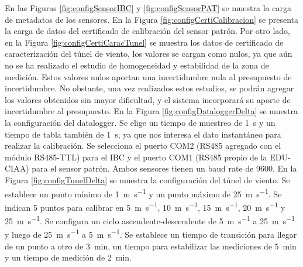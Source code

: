En las Figuras \ref{fig:configSensorIBC} y \ref{fig:configSensorPAT} se muestra la carga de metadatos de los sensores. En la Figura \ref{fig:configCertiCalibracion} se presenta la carga de datos del certificado de calibración del sensor patrón. Por otro lado, en la Figura \ref{fig:configCertiCaracTunel} se muestra los datos de certificado de caracterización del túnel de viento, los valores se cargan como nulos, ya que aún no se ha realizado el estudio de homogeneidad y estabilidad de la zona de medición. Estos valores nulos aportan una incertidumbre nula al presupuesto de incertidumbre. No obstante, una vez realizados estos estudios, se podrán agregar los valores obtenidos sin mayor dificultad, y el sistema incorporará su aporte de incertidumbre al presupuesto. En la Figura \ref{fig:configDataloggerDelta} se muestra la configuración del datalogger. Se elige un tiempo de muestreo de \SI{1}{\second} y un tiempo de tabla también de \SI{1}{\second}, ya que nos interesa el dato instantáneo para realizar la calibración. Se selecciona el puerto COM2 (RS485 agregado con el módulo RS485-TTL) para el IBC y el puerto COM1 (RS485 propio de la EDU-CIAA) para el sensor patrón. Ambos sensores tienen un baud rate de \SI{9600}{}. En la Figura \ref{fig:configTunelDelta} se muestra la configuración del túnel de viento. Se establece un punto mínimo de \SI{1}{\meter\per\second} y un punto máximo de \SI{25}{\meter\per\second}. Se indican 5 puntos para calibrar en \SI{5}{\meter\per\second}, \SI{10}{\meter\per\second}, \SI{15}{\meter\per\second}, \SI{20}{\meter\per\second} y \SI{25}{\meter\per\second}. Se configura un ciclo ascendente-descendente de \SI{5}{\meter\per\second} a \SI{25}{\meter\per\second} y luego de \SI{25}{\meter\per\second} a \SI{5}{\meter\per\second}. Se establece un tiempo de transición para llegar de un punto a otro de \SI{3}{\minute}, un tiempo para estabilizar las mediciones de \SI{5}{\minute} y un tiempo de medición de \SI{2}{\minute}.
